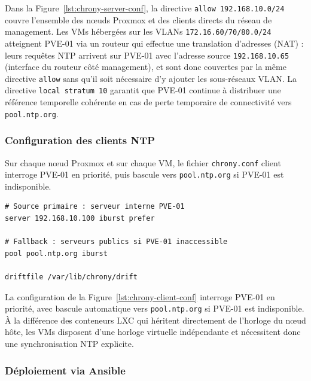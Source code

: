 \par Dans la Figure~\ref{lst:chrony-server-conf}, la directive \texttt{allow 192.168.10.0/24} couvre l'ensemble des nœuds Proxmox et des clients directs du réseau de management. Les VMs hébergées sur les VLANs \texttt{172.16.60/70/80.0/24} atteignent PVE-01 via un routeur qui effectue une translation d'adresses (NAT) : leurs requêtes NTP arrivent sur PVE-01 avec l'adresse source \texttt{192.168.10.65} (interface du routeur côté management), et sont donc couvertes par la même directive \texttt{allow} sans qu'il soit nécessaire d'y ajouter les sous-réseaux VLAN. La directive \texttt{local stratum 10} garantit que PVE-01 continue à distribuer une référence temporelle cohérente en cas de perte temporaire de connectivité vers \texttt{pool.ntp.org}.

\subsubsection{Configuration des clients NTP}

\par Sur chaque nœud Proxmox et sur chaque VM, le fichier \texttt{chrony.conf} client interroge PVE-01 en priorité, puis bascule vers \texttt{pool.ntp.org} si PVE-01 est indisponible.\\

\begin{lstlisting}[style=sonacode,language={},caption={Configuration Chrony côté clients (noeuds et VMs)},label={lst:chrony-client-conf}]
# Source primaire : serveur interne PVE-01
server 192.168.10.100 iburst prefer

# Fallback : serveurs publics si PVE-01 inaccessible
pool pool.ntp.org iburst

driftfile /var/lib/chrony/drift
\end{lstlisting}

\par La configuration de la Figure~\ref{lst:chrony-client-conf} interroge PVE-01 en priorité, avec bascule automatique vers \texttt{pool.ntp.org} si PVE-01 est indisponible. À la différence des conteneurs LXC qui héritent directement de l'horloge du nœud hôte, les VMs disposent d'une horloge virtuelle indépendante et nécessitent donc une synchronisation NTP explicite.

\subsubsection{Déploiement via Ansible}

